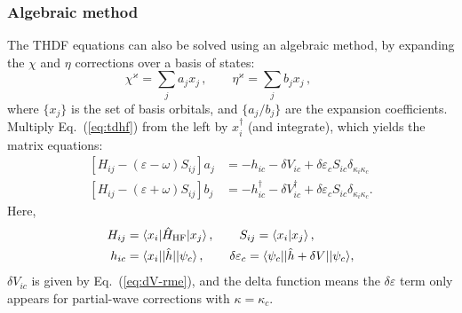 \documentclass[10pt,twocolumn,a4paper]{article}%
\newcommand{\bra}[1]{\ensuremath{\langle #1|}}	%
\newcommand{\ket}[1]{\ensuremath{|#1\rangle}}	%
\newcommand{\braket}[1]{\ensuremath{\langle #1\rangle}}	%
\newcommand{\be}{\begin{equation}}
\newcommand{\ee}{\end{equation}}
\def\d{\ensuremath{{\rm d}}}
\def\en{\ensuremath{\varepsilon}}
\renewcommand{\k}{\ensuremath{\kappa}}
\newcommand{\vk}{\ensuremath{\varkappa}}
\begin{document}



\subsubsection{Algebraic method}


The THDF equations  can also be solved using an algebraic method, by expanding the $\chi$ and $\eta$ corrections over a basis of states:
\be
\chi^{\varkappa} = \sum_j a_j x_j \,, \qquad  \eta^{\varkappa} = \sum_j b_j x_j \,, \qquad
\ee
where $\{x_j\}$ is the set of basis orbitals, and $\{a_j/b_j\}$ are the expansion coefficients.
Multiply Eq.~(\ref{eq:tdhf}) from the left by $x_i^\dag$ (and integrate), which yields the matrix equations:
\begin{equation}\begin{split}\label{eq:TDHF-Matrix}
\left[H_{ij} - (\en-\omega)S_{ij}\right] a_j &= -h_{ic} - \delta V_{ic} + \delta\en_{c}S_{ic}\delta_{\kappa_i\k_c} \\
\left[H_{ij} - (\en+\omega)S_{ij}\right] b_j &= -h_{ic}^\dagger - \delta V_{ic}^\dagger + \delta\en_{c}S_{ic}\delta_{\kappa_i\k_c}.
\end{split}\end{equation}
Here,
\begin{equation}\begin{split}
H_{ij} &= \bra{x_i}\hat H_{\rm HF}\ket{x_j} \, , \qquad S_{ij} = \braket{x_i|x_j}\,,  \\
h_{ic} &= \bra{x_i}|\hat h |\ket{\psi_c} \,,\qquad \delta\en_c = \bra{\psi_c}|\hat h + \delta V|\ket{\psi_c}, %
\end{split}\end{equation}
$\delta V_{ic} $ is given by Eq.~(\ref{eq:dV-rme}), and the delta function means the $\delta\en$ term only appears for partial-wave corrections with $\kappa = \kappa_c$.
\end{document}
